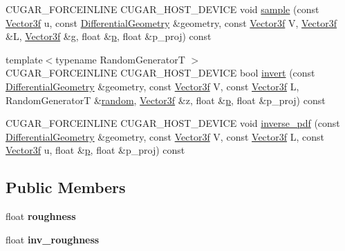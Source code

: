 \begin{DoxyCompactItemize}
\item 
C\+U\+G\+A\+R\+\_\+\+F\+O\+R\+C\+E\+I\+N\+L\+I\+NE C\+U\+G\+A\+R\+\_\+\+H\+O\+S\+T\+\_\+\+D\+E\+V\+I\+CE void \hyperlink{structcugar_1_1_g_g_x_bsdf_ab531cb23b74cb1f66a1885f68d8de64b}{sample} (const \hyperlink{structcugar_1_1_vector}{Vector3f} u, const \hyperlink{structcugar_1_1_differential_geometry}{Differential\+Geometry} \&geometry, const \hyperlink{structcugar_1_1_vector}{Vector3f} V, \hyperlink{structcugar_1_1_vector}{Vector3f} \&L, \hyperlink{structcugar_1_1_vector}{Vector3f} \&g, float \&\hyperlink{structcugar_1_1_g_g_x_bsdf_a47b841b65fb62b596e3c436567b9912d}{p}, float \&p\+\_\+proj) const
\item 
{\footnotesize template$<$typename Random\+GeneratorT $>$ }\\C\+U\+G\+A\+R\+\_\+\+F\+O\+R\+C\+E\+I\+N\+L\+I\+NE C\+U\+G\+A\+R\+\_\+\+H\+O\+S\+T\+\_\+\+D\+E\+V\+I\+CE bool \hyperlink{structcugar_1_1_g_g_x_bsdf_a159b40b9d3529fe77865ece0eb564568}{invert} (const \hyperlink{structcugar_1_1_differential_geometry}{Differential\+Geometry} \&geometry, const \hyperlink{structcugar_1_1_vector}{Vector3f} V, const \hyperlink{structcugar_1_1_vector}{Vector3f} L, Random\+GeneratorT \&\hyperlink{group___sampling_module_gaec17bbbfd36295353081b7b4480d933d}{random}, \hyperlink{structcugar_1_1_vector}{Vector3f} \&z, float \&\hyperlink{structcugar_1_1_g_g_x_bsdf_a47b841b65fb62b596e3c436567b9912d}{p}, float \&p\+\_\+proj) const
\item 
C\+U\+G\+A\+R\+\_\+\+F\+O\+R\+C\+E\+I\+N\+L\+I\+NE C\+U\+G\+A\+R\+\_\+\+H\+O\+S\+T\+\_\+\+D\+E\+V\+I\+CE void \hyperlink{structcugar_1_1_g_g_x_bsdf_a340206c9ac0de4146ed789d3a27b09af}{inverse\+\_\+pdf} (const \hyperlink{structcugar_1_1_differential_geometry}{Differential\+Geometry} \&geometry, const \hyperlink{structcugar_1_1_vector}{Vector3f} V, const \hyperlink{structcugar_1_1_vector}{Vector3f} L, const \hyperlink{structcugar_1_1_vector}{Vector3f} u, float \&\hyperlink{structcugar_1_1_g_g_x_bsdf_a47b841b65fb62b596e3c436567b9912d}{p}, float \&p\+\_\+proj) const
\end{DoxyCompactItemize}
\subsection*{Public Members}
\begin{DoxyCompactItemize}
\item 
\mbox{\label{structcugar_1_1_g_g_x_bsdf_a34eb2af25d6ca10093590ede00b7a5aa}} 
float {\bfseries roughness}
\item 
\mbox{\label{structcugar_1_1_g_g_x_bsdf_a18835c94ae1c29dae19a54b35fd31de9}} 
float {\bfseries inv\+\_\+roughness}
\end{DoxyCompactItemize}


